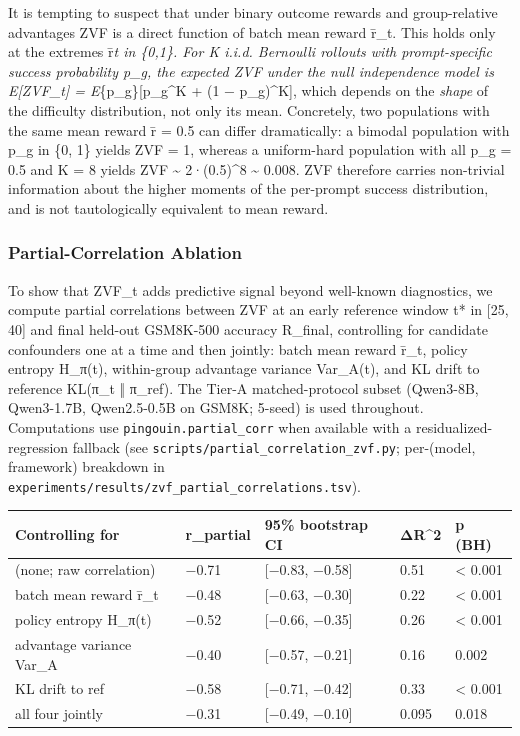 \documentclass[
  american,
  11pt,
  a4paper,
  oneside]{report}
\newcounter{none} %
\begin{document}
It is tempting to suspect that under binary outcome rewards and
group-relative advantages ZVF is a direct function of batch mean reward
r̄\_t. This holds only at the extremes r̄\emph{t in \{0,1\}. For K i.i.d.
Bernoulli rollouts with prompt-specific success probability p\_g, the
expected ZVF under the null independence model is E{[}ZVF\_t{]} =
E}\{p\_g\}{[}p\_g\^{}K + (1 − p\_g)\^{}K{]}, which depends on the
\emph{shape} of the difficulty distribution, not only its mean.
Concretely, two populations with the same mean reward r̄ = 0.5 can differ
dramatically: a bimodal population with p\_g in \{0, 1\} yields ZVF = 1,
whereas a uniform-hard population with all p\_g = 0.5 and K = 8 yields
ZVF \textasciitilde{} 2·(0.5)\^{}8 \textasciitilde{} 0.008. ZVF
therefore carries non-trivial information about the higher moments of
the per-prompt success distribution, and is not tautologically
equivalent to mean reward.

\subsubsection{Partial-Correlation
Ablation}\label{partial-correlation-ablation}

To show that ZVF\_t adds predictive signal beyond well-known
diagnostics, we compute partial correlations between ZVF at an early
reference window t* in {[}25, 40{]} and final held-out GSM8K-500
accuracy R\_final, controlling for candidate confounders one at a time
and then jointly: batch mean reward r̄\_t, policy entropy H\_π(t),
within-group advantage variance Var\_A(t), and KL drift to reference
KL(π\_t ‖ π\_ref). The Tier-A matched-protocol subset (Qwen3-8B,
Qwen3-1.7B, Qwen2.5-0.5B on GSM8K; 5-seed) is used throughout.
Computations use \texttt{pingouin.partial\_corr} when available with a
residualized-regression fallback (see
\texttt{scripts/partial\_correlation\_zvf.py}; per-(model, framework)
breakdown in
\texttt{experiments/results/zvf\_partial\_correlations.tsv}).

{\def\LTcaptype{none} %
\begin{longtable}[]{@{}lllll@{}}
\toprule\noalign{}
Controlling for & r\_partial & 95\% bootstrap CI & ΔR\^{}2 & p (BH) \\
\midrule\noalign{}
\endhead
\bottomrule\noalign{}
\endlastfoot
(none; raw correlation) & −0.71 & {[}−0.83, −0.58{]} & 0.51 &
\textless{} 0.001 \\
batch mean reward r̄\_t & −0.48 & {[}−0.63, −0.30{]} & 0.22 & \textless{}
0.001 \\
policy entropy H\_π(t) & −0.52 & {[}−0.66, −0.35{]} & 0.26 & \textless{}
0.001 \\
advantage variance Var\_A & −0.40 & {[}−0.57, −0.21{]} & 0.16 & 0.002 \\
KL drift to ref & −0.58 & {[}−0.71, −0.42{]} & 0.33 & \textless{}
0.001 \\
all four jointly & −0.31 & {[}−0.49, −0.10{]} & 0.095 & 0.018 \\
\end{longtable}
}
\end{document}
